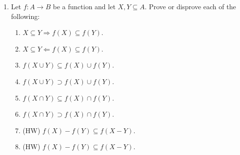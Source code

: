 \documentclass[12pt, reqno]{amsart}
\begin{document}
\begin{enumerate}
\item   Let $f\colon A \to B$ be a function and let $X,Y \subseteq A$. Prove
  or disprove each of the following:
  \begin{enumerate}
  \item $X \subseteq Y \Rightarrow f(X) \subseteq f(Y)$.
  \item $X \subseteq Y \Leftarrow f(X) \subseteq f(Y)$.
  \item $f(X \cup Y) \subseteq f(X) \cup f(Y)$.
  \item $f(X \cup Y) \supset f(X) \cup f(Y)$.
  \item $f(X \cap Y) \subseteq f(X) \cap f(Y)$.
  \item $f(X \cap Y) \supset f(X) \cap f(Y)$.
  \item (HW) $f(X) - f(Y) \subseteq f(X - Y)$.
  \item (HW) $f(X) - f(Y) \subseteq f(X - Y)$.
\end{enumerate}  

  \end{enumerate}
\end{document}
